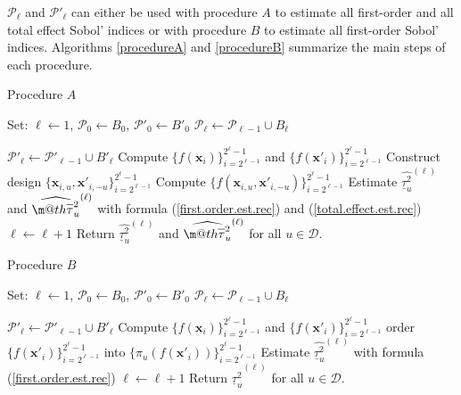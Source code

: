 \documentclass[]{elsarticle}
\makeatletter
\theoremstyle{definition}
\newcommand{\bvec}[1]{\boldsymbol{#1}}
\newcommand{\vx}{\bvec{x}}
\newcommand*{\ov}[1]{
  \m@th\overline{\mbox{#1}\raisebox{2mm}{}}
}
\makeatother
\begin{document}
$\mathcal{P}_{\ell}$ and $\mathcal{P}'_{\ell}$ can either be used with procedure $A$ to estimate all first-order and all total effect Sobol' indices or with procedure $B$ to estimate all first-order Sobol' indices. Algorithms \ref{procedureA} and \ref{procedureB} summarize the main steps of each procedure.
\begin{algorithm}[!ht]
\caption{Procedure $A$}
\begin{algorithmic}[1]
\vspace*{0.2cm}
\State Set: $\ell \leftarrow 1$, $\mathcal{P}_{0} \leftarrow B_0$, ${\mathcal{P}'}_{0} \leftarrow {B'}_0$
\State $\mathcal{P}_\ell \leftarrow \mathcal{P}_{\ell-1} \cup B_\ell$

\hspace*{-0.3cm} $\mathcal{P}'_\ell \leftarrow \mathcal{P}'_{\ell-1} \cup {B'}_\ell$
\State Compute $\{f(\vx_i)\}_{i=2^{\ell-1}}^{2^\ell-1}$ and $\{f({\vx'}_i)\}_{i=2^{\ell-1}}^{2^\ell-1}$
\State Construct design $\{\vx_{i,u},{\vx'}_{i,-u}\}_{i=2^{\ell-1}}^{2^{\ell}-1}$
\State Compute  $\{f(\vx_{i,u},{\vx'}_{i,-u})\}_{i=2^{\ell-1}}^{2^\ell-1}$
\State Estimate $\widehat{\underline{\tau}_u^2}^{(\ell)}$ and $\widehat{\ov{$\tau$}_u^2}^{(\ell)}$ with formula (\ref{first.order.est.rec}) and (\ref{total.effect.est.rec})
\EndFor
\State $\ell \leftarrow \ell + 1$
\EndWhile
\State Return $\widehat{\underline{\tau}_u^2}^{(\ell)}$ and $\widehat{\ov{$\tau$}_u^2}^{(\ell)}$ for all $u \in \mathcal{D}$.
\end{algorithmic}
\label{procedureA}
\end{algorithm}
\begin{algorithm}[!ht]
\caption{Procedure $B$}
\begin{algorithmic}[1]
\vspace*{0.2cm}
\State Set: $\ell \leftarrow 1$, $\mathcal{P}_{0} \leftarrow B_0$, ${\mathcal{P}'}_{0} \leftarrow {B'}_0$
\State $\mathcal{P}_\ell \leftarrow \mathcal{P}_{\ell-1} \cup B_\ell$

\hspace*{-0.3cm} $\mathcal{P}'_\ell \leftarrow \mathcal{P}'_{\ell-1} \cup {B'}_\ell$
\State Compute $\{f(\vx_i)\}_{i=2^{\ell-1}}^{2^\ell-1}$ and $\{f({\vx'}_i)\}_{i=2^{\ell-1}}^{2^\ell-1}$
\State  order $\{f({\vx'}_i)\}_{i=2^{\ell-1}}^{2^\ell-1}$ into $\{\pi_u(f({\vx'}_i))\}_{i=2^{\ell-1}}^{2^\ell-1}$
\State Estimate $\widehat{\underline{\tau}_u^2}^{(\ell)}$ with formula (\ref{first.order.est.rec})
\EndFor
\State $\ell \leftarrow \ell + 1$
\EndWhile
\State Return $\widehat{\underline{\tau}_u^2}^{(\ell)}$ for all $u \in \mathcal{D}$.
\end{algorithmic}
\label{procedureB}
\end{algorithm}
\end{document}
